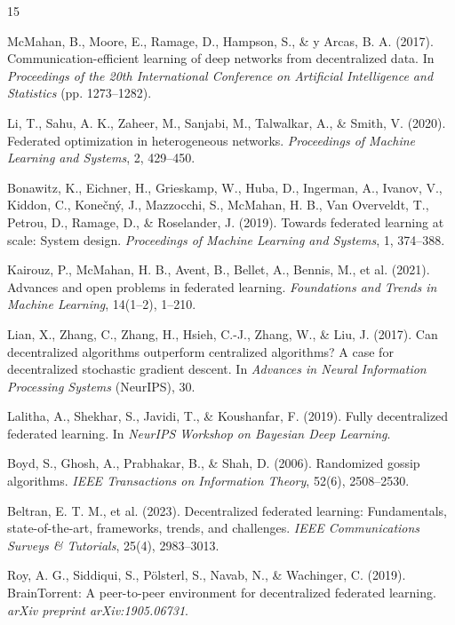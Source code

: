\documentclass[12pt]{report}
\begin{document}
\begin{thebibliography}{15}

McMahan, B., Moore, E., Ramage, D., Hampson, S., \& y Arcas, B. A. (2017).
Communication-efficient learning of deep networks from decentralized data.
In \textit{Proceedings of the 20th International Conference on Artificial
Intelligence and Statistics} (pp. 1273--1282).

Li, T., Sahu, A. K., Zaheer, M., Sanjabi, M., Talwalkar, A., \& Smith, V.
(2020). Federated optimization in heterogeneous networks.
\textit{Proceedings of Machine Learning and Systems}, 2, 429--450.

Bonawitz, K., Eichner, H., Grieskamp, W., Huba, D., Ingerman, A., Ivanov,
V., Kiddon, C., Konečný, J., Mazzocchi, S., McMahan, H. B., Van Overveldt,
T., Petrou, D., Ramage, D., \& Roselander, J. (2019). Towards federated
learning at scale: System design. \textit{Proceedings of Machine Learning
and Systems}, 1, 374--388.

Kairouz, P., McMahan, H. B., Avent, B., Bellet, A., Bennis, M., et al.
(2021). Advances and open problems in federated learning.
\textit{Foundations and Trends in Machine Learning}, 14(1--2), 1--210.

Lian, X., Zhang, C., Zhang, H., Hsieh, C.-J., Zhang, W., \& Liu, J. (2017).
Can decentralized algorithms outperform centralized algorithms? A case for
decentralized stochastic gradient descent. In \textit{Advances in Neural
Information Processing Systems} (NeurIPS), 30.

Lalitha, A., Shekhar, S., Javidi, T., \& Koushanfar, F. (2019). Fully
decentralized federated learning. In \textit{NeurIPS Workshop on Bayesian
Deep Learning}.

Boyd, S., Ghosh, A., Prabhakar, B., \& Shah, D. (2006). Randomized gossip
algorithms. \textit{IEEE Transactions on Information Theory}, 52(6),
2508--2530.

Beltran, E. T. M., et al. (2023). Decentralized federated learning:
Fundamentals, state-of-the-art, frameworks, trends, and challenges.
\textit{IEEE Communications Surveys \& Tutorials}, 25(4), 2983--3013.

Roy, A. G., Siddiqui, S., Pölsterl, S., Navab, N., \& Wachinger, C. (2019).
BrainTorrent: A peer-to-peer environment for decentralized federated
learning. \textit{arXiv preprint arXiv:1905.06731}.


\end{thebibliography}
\end{document}
